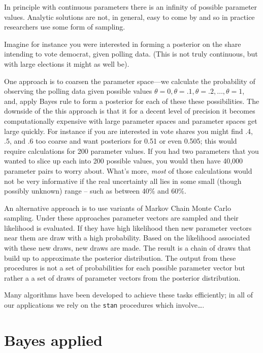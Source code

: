 \documentclass[
  12pt,
]{book}
\begin{document}
In principle with continuous parameters there is an infinity of possible parameter values. Analytic solutions are not, in general, easy to come by and so in practice researchers use some form of sampling.

Imagine for instance you were interested in forming a posterior on the share intending to vote democrat, given polling data. (This is not truly continuous, but with large elections it might as well be).

One approach is to coarsen the parameter space---we calculate the probability of observing the polling data given possible values \(\theta = 0, \theta = .1, \theta = .2, \dots, \theta = 1\), and, apply Bayes rule to form a posterior for each of these these possibilities. The downside of the this approach is that it for a decent level of precision it becomes computationally expensive with large parameter spaces and parameter spaces get large quickly. For instance if you are interested in vote shares you might find .4, .5, and .6 too coarse and want posteriors for 0.51 or even 0.505; this would require calculations for 200 parameter values. If you had two parameters that you wanted to slice up each into 200 possible values, you would then have 40,000 parameter pairs to worry about. What's more, \emph{most} of those calculations would not be very informative if the real uncertainty all lies in some small (though possibly unknown) range -- such as between 40\% and 60\%.

An alternative approach is to use variants of Markov Chain Monte Carlo sampling. Under these approaches parameter vectors are sampled and their likelihood is evaluated. If they have high likelihood then new parameter vectors near them are draw with a high probability. Based on the likelihood associated with these new draws, new draws are made. The result is a chain of draws that build up to approximate the posterior distribution. The output from these procedures is not a set of probabilities for each possible parameter vector but rather a a set of draws of parameter vectors from the posterior distribution.

Many algorithms have been developed to achieve these tasks efficiently; in all of our applications we rely on the \texttt{stan} procedures which involve\ldots.

\hypertarget{bayes-applied}{%
\section{Bayes applied}\label{bayes-applied}}
\end{document}

